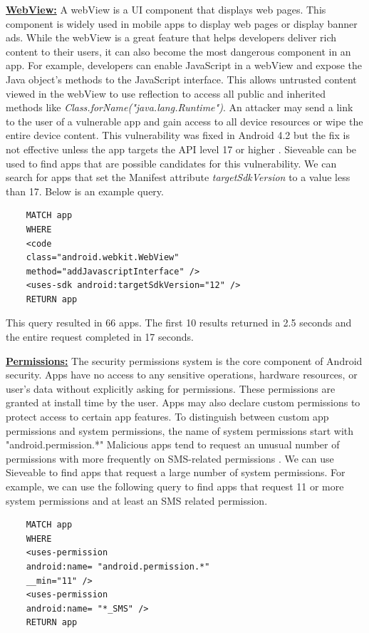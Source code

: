 \underline{\textbf{WebView:}}
A webView is a UI component that displays web pages. 
This component is widely used in mobile apps to display web pages or display banner ads.
While the webView is a great feature that helps developers deliver rich content to their users, it can also become the most dangerous component in an app.
For example, developers can enable JavaScript in a webView and expose the Java object's methods to the JavaScript interface.
This allows untrusted  content viewed in the webView to use reflection to access all public and inherited methods like \textit{Class.forName("java.lang.Runtime")}.
An attacker may send a link to the user of a vulnerable app and gain access to all device resources or wipe the entire device content. 
This vulnerability was fixed in Android 4.2 but the fix is not effective unless the app targets the API level 17 or higher \cite{WebViewVulnerability}.
Sieveable can be used to find apps that are possible candidates for this vulnerability.
We can search for apps that set the Manifest attribute \textit{targetSdkVersion} to a value less than 17.  Below is an example query.

\begin{verbatim}
	MATCH app
	WHERE
	<code 
	class="android.webkit.WebView" 
	method="addJavascriptInterface" />
	<uses-sdk android:targetSdkVersion="12" />
	RETURN app
\end{verbatim}

This query resulted in 66 apps. The first 10 results returned in 2.5 seconds and the entire request completed in 17 seconds.

\underline{\textbf{Permissions:}}
The security permissions system is the core component of Android security.
Apps have no access to any sensitive operations, hardware resources, or user's data without explicitly asking for permissions. These permissions are granted at install time by the user.
Apps may also declare custom permissions to protect access to certain app features.
To distinguish between custom app permissions and system permissions, the name of system permissions start with "android.permission.*"
Malicious apps tend to request an unusual number of permissions with more frequently on SMS-related permissions \cite{zhou_2012_SP_dissecting}.
We can use Sieveable to find apps that request a large number of system permissions.
For example, we can use the following query to find apps that request 11 or more system permissions and at least an SMS related permission.

\begin{verbatim}
	MATCH app
	WHERE
	<uses-permission 
	android:name= "android.permission.*" 
	__min="11" />
	<uses-permission 
	android:name= "*_SMS" />
	RETURN app
\end{verbatim}

